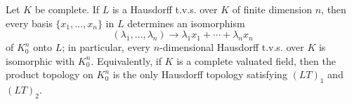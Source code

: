 Let $K$ be complete. If $L$ is a Hausdorff t.v.s. over $K$ of finite dimension $n$, then every basis $\{x_1, \ldots, x_n\}$ in $L$ determines an isomorphism
$$(\lambda_1, \ldots, \lambda_n) \rightarrow \lambda_1 x_1 + \cdots + \lambda_n x_n$$
of $K_0^n$ onto $L$; in particular, every $n$-dimensional Hausdorff t.v.s. over $K$ is isomorphic with $K_0^n$. Equivalently, if $K$ is a complete valuated field, then the product topology on $K_0^n$ is the only Hausdorff topology satisfying $(LT)_1$ and $(LT)_2$.
